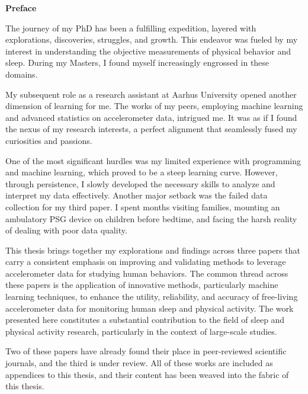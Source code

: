 \newpage

  
\textsf{\textbf{\Large{Preface}}}

\vspace*{\baselineskip}

The journey of my PhD has been a fulfilling expedition, layered with explorations, discoveries, struggles, and growth. This endeavor was fueled by my interest in understanding the objective measurements of physical behavior and sleep. During my Masters, I found myself increasingly engrossed in these domains.

My subsequent role as a research assistant at Aarhus University opened another dimension of learning for me. The works of my peers, employing machine learning and advanced statistics on accelerometer data, intrigued me. It was as if I found the nexus of my research interests, a perfect alignment that seamlessly fused my curiosities and passions.

One of the most significant hurdles was my limited experience with programming and machine learning, which proved to be a steep learning curve. However, through persistence, I slowly developed the necessary skills to analyze and interpret my data effectively. Another major setback was the failed data collection for my third paper. I spent months visiting families, mounting an ambulatory PSG device on children before bedtime, and facing the harsh reality of dealing with poor data quality.

This thesis brings together my explorations and findings across three papers that carry a consistent emphasis on improving and validating methods to leverage accelerometer data for studying human behaviors. The common thread across these papers is the application of innovative methods, particularly machine learning techniques, to enhance the utility, reliability, and accuracy of free-living accelerometer data for monitoring human sleep and physical activity. The work presented here constitutes a substantial contribution to the field of sleep and physical activity research, particularly in the context of large-scale studies.

Two of these papers have already found their place in peer-reviewed scientific journals, and the third is under review. All of these works are included as appendices to this thesis, and their content has been weaved into the fabric of this thesis.


